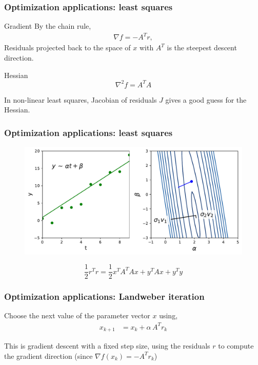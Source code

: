 \documentclass[xcolor={dvipsnames}]{beamer}
\begin{document}
\begin{frame}
\frametitle{Optimization applications: least squares}
\begin{exampleblock}{Gradient}
By the chain rule,
\begin{align*}
 \nabla f = - A^T r,
\end{align*}
Residuals projected back to the space of $x$ with $A^T$ is the steepest descent direction.
\end{exampleblock}
\begin{exampleblock}{Hessian}
$$\nabla^2 f = A^T A $$

In non-linear least squares, Jacobian of residuals $J$ gives a good guess for the Hessian.
\end{exampleblock}
\end{frame}

\begin{frame}
\frametitle{Optimization applications: least squares}
\begin{figure}
\includegraphics[width=\textwidth]{figs/linear_fit.pdf}
\end{figure}
\begin{equation*}
\frac{1}{2} r^T r = \frac{1}{2} x^T A^T A x + y^T A x + y^T y
\end{equation*}
\end{frame}

\begin{frame}
\frametitle{Optimization applications: Landweber iteration}
Choose the next value of the parameter vector $x$ using,
\begin{align*}
x_{k+1}& = x_k + \alpha \, A^T r_k 
\end{align*}
\begin{block}{}
This is gradient descent with a fixed step size, using the residuals $r$ to compute the gradient direction (since $\nabla f(x_k) = - A^T r_k$)
\end{block}
\end{frame}
\end{document}
